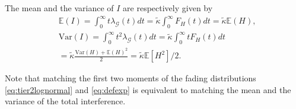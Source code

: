 \documentclass[lettersize,journal]{IEEEtran}
\begin{document}
The mean and the variance of $I$ are respectively given by
\begin{align}
  \label{eq:totmean}
  &\mathbb{E}\left(I \right) = \int_{0}^{\infty} t\lambda_{\mathcal{G}}(t) dt = \tilde{\kappa} \int_{0}^{\infty}F_H(t) dt =\tilde{\kappa} \mathbb{E}(H),\\
  \label{eq:totvar}
  &\text{Var}\left(I \right) = \int_{0}^{\infty} t^2\lambda_{\mathcal{G}}(t) dt= \tilde{\kappa} \int_0^{\infty}tF_H(t) dt  \nonumber \\
  &= \tilde{\kappa} \frac{\text{Var}(H) + \mathbb{E}(H)^2}{2} = \tilde{\kappa}  \mathbb{E}[H^2]/2.
\end{align}

Note that matching the first two moments of the fading distributions \eqref{eq:tier2lognormal} and \eqref{eq:defexp} is equivalent to matching the mean and the variance of the total interference.






















\end{document}
